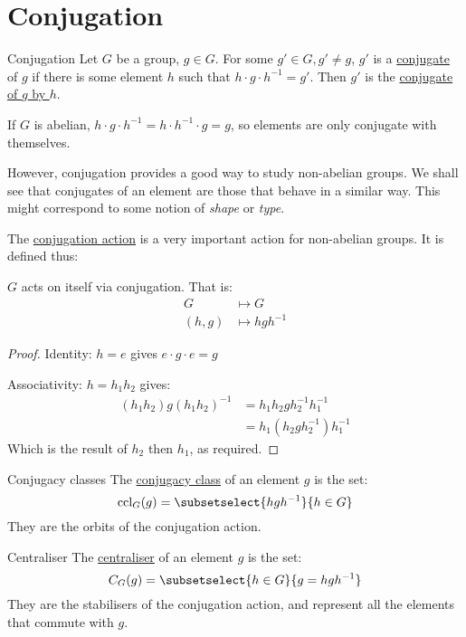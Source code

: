 \documentclass[../Main.tex]{subfiles}
\begin{document}
\section{Conjugation}
\begin{definition}{Conjugation}
    Let $G$ be a group, $g \in G$. For some $g' \in G, g' \neq g$, $g'$ is a \underline{conjugate} of $g$ if there is some element $h$ such that $h \cdot g \cdot h^{-1} = g'$. Then $g'$ is the \underline{conjugate of $g$ by $h$}.
\end{definition}
\begin{example}
    If $G$ is abelian, $h \cdot g \cdot h^{-1} = h \cdot h^{-1} \cdot g = g$, so elements are only conjugate with themselves.
\end{example}
However, conjugation provides a good way to study non-abelian groups. We shall see that conjugates of an element are those that behave in a similar way. This might correspond to some notion of \textit{shape} or \textit{type}.\par
The \underline{conjugation action} is a very important action for non-abelian groups. It is defined thus:
\begin{proposition}
    $G$ acts on itself via conjugation. That is:
    \begin{align}
        G &\mapsto G \\
        (h, g) &\mapsto h g h^{-1} \nonumber
    \end{align}
\end{proposition}
\begin{proof}
    Identity: $h = e$ gives $e \cdot g \cdot e = g$ \tick\par
    Associativity: $h = h_1 h_2$ gives:
    \begin{align*}
        (h_1 h_2) g (h_1 h_2)^{-1} &= h_1 h_2 g h_2^{-1} h_1^{-1} \\
        &= h_1 (h_2 g h_2^{-1}) h_1^{-1}
    \end{align*}
    Which is the result of $h_2$ then $h_1$, as required.
\end{proof}
\begin{definition}{Conjugacy classes}
    The \underline{conjugacy class} of an element $g$ is the set:
    \begin{equation*}
        \ccl_G(g) = \subsetselect{hgh^{-1}}{h \in G}
    \end{equation*}
    They are the orbits of the conjugation action.
\end{definition}
\begin{definition}{Centraliser}
    The \underline{centraliser} of an element $g$ is the set:
    \begin{equation*}
        C_G(g) = \subsetselect{h \in G}{g = hgh^{-1}}
    \end{equation*}
    They are the stabilisers of the conjugation action, and represent all the elements that commute with $g$.
\end{definition}
\end{document}
